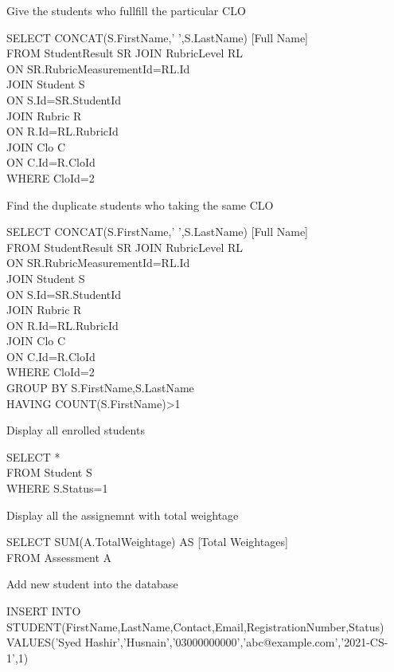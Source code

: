 \documentclass[10pt,a4paper]{article}
\newenvironment{problem}[2][Problem]{\begin{trivlist}
\item[\hskip \labelsep {\bfseries #1}\hskip \labelsep {\bfseries #2.}]}{\end{trivlist}}
\begin{document}
\begin{problem}{10}
Give the students who fullfill the particular CLO
\end{problem}
SELECT CONCAT(S.FirstName,' ',S.LastName) [Full Name]\\
FROM StudentResult SR JOIN RubricLevel  RL\\
ON SR.RubricMeasurementId=RL.Id\\
JOIN Student S\\
ON  S.Id=SR.StudentId\\
JOIN Rubric R \\
ON R.Id=RL.RubricId\\
JOIN Clo C\\
ON C.Id=R.CloId\\
WHERE CloId=2

\begin{problem}{11}
Find the duplicate students who taking the same CLO
\end{problem}
SELECT CONCAT(S.FirstName,' ',S.LastName) [Full Name]\\
FROM StudentResult SR JOIN RubricLevel  RL\\
ON SR.RubricMeasurementId=RL.Id\\
JOIN Student S\\
ON  S.Id=SR.StudentId\\
JOIN Rubric R \\
ON R.Id=RL.RubricId\\
JOIN Clo C\\
ON C.Id=R.CloId\\
WHERE CloId=2\\
GROUP BY S.FirstName,S.LastName\\
HAVING COUNT(S.FirstName)>1

\begin{problem}{12}
Display all enrolled students
\end{problem}
SELECT *\\
FROM Student S\\
WHERE S.Status=1

\begin{problem}{13}
Display all the assignemnt with total weightage
\end{problem}
SELECT SUM(A.TotalWeightage) AS [Total Weightages]\\
FROM Assessment A

\begin{problem}{14}
Add new student into the database 
\end{problem}
INSERT INTO STUDENT(FirstName,LastName,Contact,Email,RegistrationNumber,Status)\\
VALUES('Syed Hashir','Husnain','03000000000','abc@example.com','2021-CS-1',1)
\end{document}
